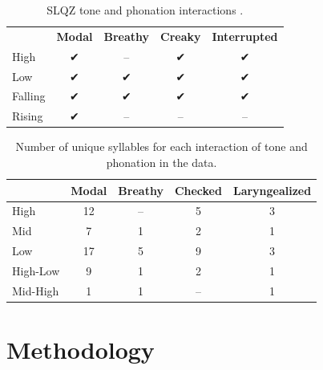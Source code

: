 \documentclass[12pt, letterpaper]{article}
\providecommand{\lsptoprule}{\midrule\toprule}
\providecommand{\lspbottomrule}{\bottomrule\midrule}
\begin{document}
\begin{table}[!ht]
	\centering
	\caption{SLQZ tone and phonation interactions \citep{chavez-peonInteractionMetricalStructure2010}.}
	\label{tab:SLQZ}
	 \begin{tabular}{lcccc}
	  \lsptoprule
					  &	 \textbf{Modal}  & \textbf{Breathy} & \textbf{Creaky} & \textbf{Interrupted} \\
		  High	& ✔︎ & -- & ✔︎ & ✔︎ \\
		  Low & ✔︎ & ✔︎ & ✔︎ & ✔︎ \\
		  Falling & ✔︎ & ✔︎ & ✔︎ & ✔︎ \\
		  Rising & ✔︎ & -- & -- & -- \\
	  \lspbottomrule
	 \end{tabular}
\end{table}

\begin{table}[!h]
	\caption{Number of unique syllables for each interaction of tone and phonation in the data.}
	\label{tab:ToneVoiceQuality}
	\centering

	\begin{tabular}{lcccc}
	\lsptoprule
		& \textbf{Modal} & \textbf{Breathy} & \textbf{Checked} & \textbf{Laryngealized} \\
	\hline
	High		& 12 & -- & 5	& 3 \\
	Mid			& 7 & 1  & 2	& 1 \\
	Low			& 17 & 5  & 9	& 3 \\
	High-Low	& 9 & 1  & 2	& 1 \\
	Mid-High	& 1	 & 1  & --	& 1 \\
	\lspbottomrule
	\end{tabular}
\end{table}


\section{Methodology} \label{sec:Methods}
\end{document}

